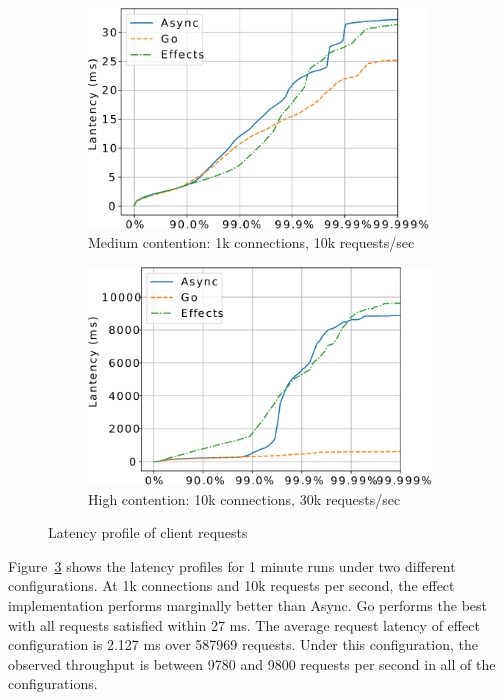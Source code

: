 \documentclass{llncs}
\begin{document}
\begin{figure}
	\centering
	\begin{subfigure}[t]{0.48\textwidth}
		\includegraphics[width=0.99\textwidth]{graphs/latency_c1k_r10k.pdf}
		\caption{Medium contention: 1k connections, 10k requests/sec}
		\label{grf:c1k_r10k}
	\end{subfigure}
	\begin{subfigure}[t]{0.48\textwidth}
		\includegraphics[width=\textwidth]{graphs/latency_c10k_r30k.pdf}
		\caption{High contention: 10k connections, 30k requests/sec}
		\label{grf:c10k_r30k}
	\end{subfigure}
	\caption{Latency profile of client requests}
	\label{grf:latency}
\end{figure}

Figure~\ref{grf:latency} shows the latency profiles for 1 minute runs under two
different configurations. At 1k connections and 10k requests per second, the
effect implementation performs marginally better than Async. Go performs the
best with all requests satisfied within 27 ms. The average request latency of
effect configuration is 2.127 ms over 587969 requests. Under this
configuration, the observed throughput is between 9780 and 9800 requests per
second in all of the configurations.
\end{document}
